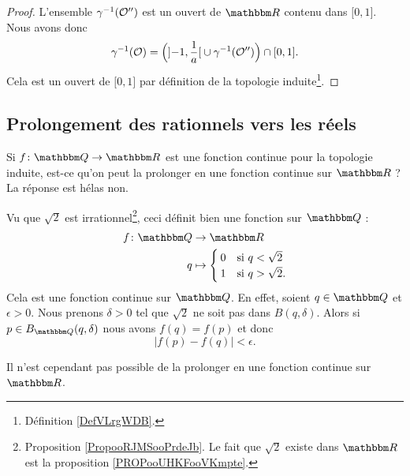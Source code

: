 \begin{proof}
    L'ensemble \( \gamma^{-1}(\mathcal{O}'')\) est un ouvert de \( \eR\) contenu dans \( \mathopen[ 0 , 1 \mathclose]\). Nous avons donc
    \begin{equation}
    \gamma^{-1}(\mathcal{O})=\Big( \mathopen] -1 , \frac{1}{ a } \mathclose[\cup\gamma^{-1}(\mathcal{O}'') \Big)\cap \mathopen[ 0 , 1 \mathclose].
    \end{equation}
    Cela est un ouvert de \( \mathopen[ 0 , 1 \mathclose]\) par définition de la topologie induite\footnote{Définition \ref{DefVLrgWDB}.}.
\end{proof}

\subsection{Prolongement des rationnels vers les réels}

Si \( f\colon \eQ\to \eR\) est une fonction continue pour la topologie induite, est-ce qu'on peut la prolonger en une fonction continue sur \( \eR\) ? La réponse est hélas non.

\begin{example}       \label{EXooWZNCooQkKdtJ}
    Vu que \( \sqrt{ 2 }\) est irrationnel\footnote{Proposition \ref{PropooRJMSooPrdeJb}. Le fait que $\sqrt{ 2 }$ existe dans \( \eR\) est la proposition \ref{PROPooUHKFooVKmpte}.}, ceci définit bien une fonction sur \( \eQ\) :
    \begin{equation}
        \begin{aligned}
            f\colon \eQ&\to \eR \\
            q&\mapsto \begin{cases}
                0    &   \text{si } q<\sqrt{ 2 }\\
                1    &    \text{si }q>\sqrt{ 2 }.
            \end{cases}
        \end{aligned}
    \end{equation}
    Cela est une fonction continue sur \( \eQ\). En effet, soient \( q\in \eQ\) et \( \epsilon>0\). Nous prenons \( \delta>0\) tel que \( \sqrt{ 2 }\) ne soit pas dans \( B(q,\delta)\). Alors si \( p\in B_{\eQ}(q,\delta)\) nous avons \( f(q)=f(p)\) et donc 
    \begin{equation}
        | f(p)-f(q) |<\epsilon.
    \end{equation}

    Il n'est cependant pas possible de la prolonger en une fonction continue sur \( \eR\).
\end{example}

